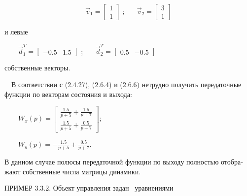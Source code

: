 \documentclass[a4paper]{article}
\begin{document}
\begin{equation*}
\vec v_1=\left[\begin{matrix}1\\1\end{matrix}\right]\;;\;\;\;\;\;\;\vec v_2=\left[\begin{matrix}3\\1\end{matrix}\right]
\end{equation*}
{\begin{russian}\sffamily
и левые
\end{russian}}

{\begin{russian}\sffamily
\ \ \ \  $\vec d_1^T=\left[\begin{matrix}-0.5&1.5\end{matrix}\right]$ ; \ \ \  $\vec
d_2^T=\left[\begin{matrix}0.5&-0.5\end{matrix}\right]$
\end{russian}}

{\begin{russian}\sffamily
собственные векторы.
\end{russian}}

{\begin{russian}\sffamily
\ \ В соответствии с (2.4.27), (2.6.4) и (2.6.6) нетрудно получить передаточные функции по векторам состояния и выхода:
\end{russian}}

{\begin{russian}\sffamily
\ \ \ \ 
$W_x(p)=\left[\begin{matrix}\frac{1.5}{p+5}+\frac{1.5}{p+7}\\\frac{1.5}{p+5}+\frac{0.5}{p+7}\end{matrix}\right]$;
\end{russian}}

{\begin{russian}\sffamily
\ \ \ \  $W_y(p)=-\frac{1.5}{p+5}+\frac{0.5}{p+7}$.
\end{russian}}

{\begin{russian}\sffamily
В данном случае полюсы передаточной функции по выходу полностью отображают собственные числа матрицы динамики.
\end{russian}}


\bigskip

{\begin{russian}\sffamily
ПРИМЕР 3.3.2. Объект управления задан \ уравнениями
\end{russian}}
\end{document}
